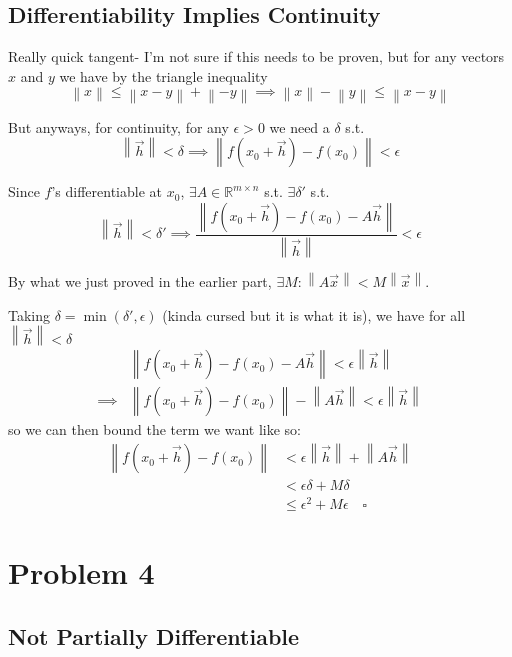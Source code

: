 \documentclass[12pt]{article}
\newcommand{\R}{\mathbb{R}}
\newcommand{\norm}[1]{\left\lVert#1\right\rVert}
\begin{document}
\pagebreak

\subsection{Differentiability Implies Continuity}

Really quick tangent- I'm not sure if this needs to be proven,
but for any vectors $x$ and $y$ we have by the triangle inequality
\[\norm{x} \le \norm{x-y}+\norm{-y} \implies \norm{x}-\norm{y} \le \norm{x-y}\]

But anyways, for continuity, for any $\epsilon > 0$ we need a $\delta$ s.t.
\[\norm{\vec{h}} < \delta \implies \norm{f\left(x_0+\vec{h}\right)-f(x_0)} < \epsilon\]

Since $f$'s differentiable at $x_0$, $\exists A \in \R^{m \times n}$
s.t. $\exists \delta'$ s.t.
\[\norm{\vec{h}} < \delta' \implies
  \frac{\norm{f\left(x_0+\vec{h}\right)-f(x_0)-A\vec{h}}}{\norm{\vec{h}}} < \epsilon\]

By what we just proved in the earlier part, $\exists M: \norm{A\vec{x}} < M\norm{\vec{x}}$.

Taking $\delta = \min(\delta', \epsilon)$ (kinda cursed but it is what it is),
we have for all $\norm{\vec{h}} < \delta$
\begin{align*}
             & \norm{f\left(x_0+\vec{h}\right)-f(x_0)-A\vec{h}} < \epsilon\norm{\vec{h}}        \\
  \implies{} & \norm{f\left(x_0+\vec{h}\right)-f(x_0)}-\norm{A\vec{h}} < \epsilon\norm{\vec{h}}
\end{align*}
so we can then bound the term we want like so:
\begin{align*}
  \norm{f\left(x_0+\vec{h}\right)-f(x_0)}
   & < \epsilon\norm{\vec{h}} + \norm{A\vec{h}} \\
   & < \epsilon\delta + M\delta                 \\
   & \le \epsilon^2 + M\epsilon\quad\square
\end{align*}

\pagebreak

\section{Problem 4}

\subsection{Not Partially Differentiable}
\end{document}
